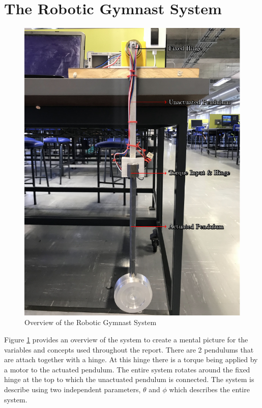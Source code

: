 \section{The Robotic Gymnast System}
\begin{figure}[h]
	\centering
	\includegraphics{./figs/overview/overview.pdf}
	\caption{Overview of the Robotic Gymnast System}
	\label{fig:overview}
\end{figure}

Figure \ref{fig:overview} provides an overview of the system to create a mental picture for the variables and concepts used throughout the report. There are 2 pendulums that are attach together with a hinge. At this hinge there is a torque being applied by a motor to the actuated pendulum. The entire system rotates around the fixed hinge at the top to which the unactuated pendulum is connected. The system is describe using two independent parameters, $\theta$ and $\phi$ which describes the entire system.\\

